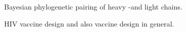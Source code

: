 

Bayesian phylogenetic pairing of heavy -and light chains.


HIV vaccine design and also vaccine design in general.







